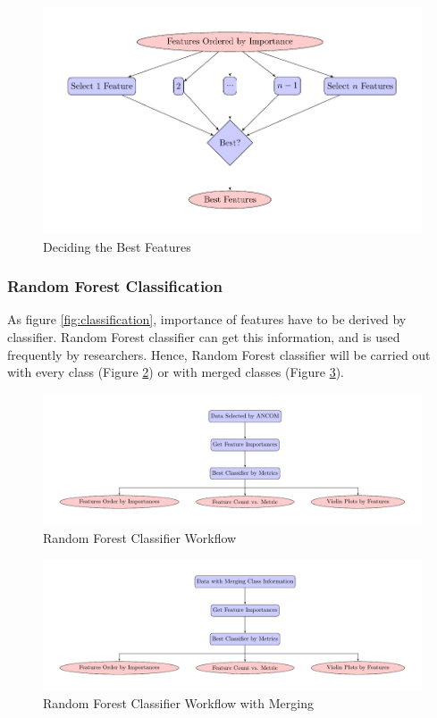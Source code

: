 \documentclass[a4paper]{article}
\begin{document}
            \begin{figure}[p]
                \centering
                \includegraphics[width=0.6 \linewidth]{figures/Classifier/best.pdf}
                \caption{Deciding the Best Features}
                \label{fig:deciding-best}
            \end{figure}

            \subsubsection{Random Forest Classification}
                As figure \ref{fig:classification}, importance of features have to be derived by classifier. Random Forest classifier \cite{RandomForest1} can get this information, and is used frequently by researchers. Hence, Random Forest classifier will be carried out with every class (Figure \ref{fig:RF-whole-workflow}) or with merged classes (Figure \ref{fig:RF-merging-workflow}).

                \begin{figure}[p]
                    \centering
                    \includegraphics[width=0.6 \linewidth]{figures/RandomForest/whole.pdf}
                    \caption{Random Forest Classifier Workflow}
                    \label{fig:RF-whole-workflow}
                \end{figure}

                \begin{figure}[p]
                    \centering
                    \includegraphics[width=0.6 \linewidth]{figures/RandomForest/merge.pdf}
                    \caption{Random Forest Classifier Workflow with Merging}
                    \label{fig:RF-merging-workflow}
                \end{figure}
\end{document}
